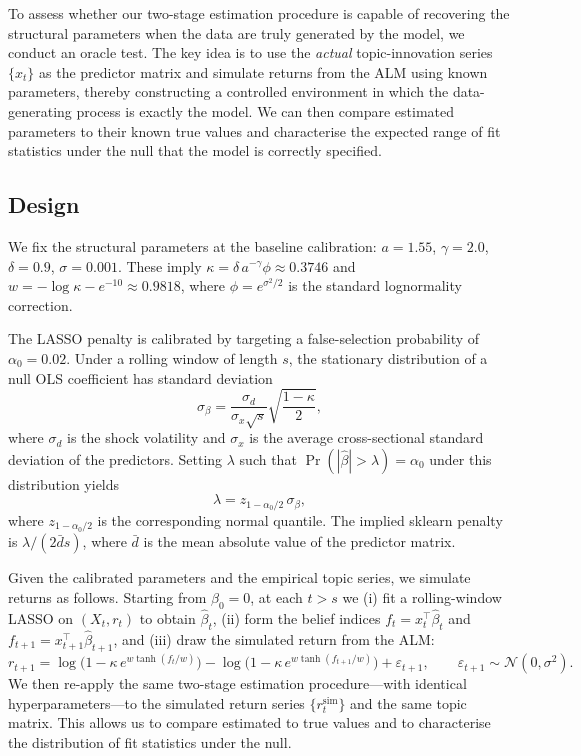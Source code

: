 \documentclass[11pt]{article}
\begin{document}
To assess whether our two-stage estimation procedure is capable of recovering the structural
parameters when the data are truly generated by the model, we conduct an oracle test.
The key idea is to use the \emph{actual} topic-innovation series $\{x_t\}$ as the predictor
matrix and simulate returns from the ALM using known parameters, thereby constructing a
controlled environment in which the data-generating process is exactly the model.
We can then compare estimated parameters to their known true values and characterise the
expected range of fit statistics under the null that the model is correctly specified.

\subsection*{Design}

We fix the structural parameters at the baseline calibration:
$a = 1.55$, $\gamma = 2.0$, $\delta = 0.9$, $\sigma = 0.001$.
These imply $\kappa = \delta \, a^{-\gamma} \phi \approx 0.3746$ and $w = -\log \kappa - e^{-10} \approx 0.9818$,
where $\phi = e^{\sigma^2/2}$ is the standard lognormality correction.

The LASSO penalty is calibrated by targeting a false-selection probability of $\alpha_0 = 0.02$.
Under a rolling window of length $s$, the stationary distribution of a null OLS coefficient has standard deviation
\[
  \sigma_{\beta} = \frac{\sigma_d}{\sigma_x \sqrt{s}} \sqrt{\frac{1-\kappa}{2}},
\]
where $\sigma_d$ is the shock volatility and $\sigma_x$ is the average cross-sectional
standard deviation of the predictors.
Setting $\lambda$ such that $\Pr(|\hat\beta| > \lambda) = \alpha_0$ under this distribution yields
\[
  \lambda = z_{1-\alpha_0/2} \,\sigma_{\beta},
\]
where $z_{1-\alpha_0/2}$ is the corresponding normal quantile.
The implied sklearn penalty is $\lambda / (2 \bar{d} s)$, where $\bar{d}$ is the mean absolute
value of the predictor matrix.

Given the calibrated parameters and the empirical topic series, we simulate returns as follows.
Starting from $\beta_0 = 0$, at each $t > s$ we (i) fit a rolling-window LASSO on
$(X_{t}, r_{t})$ to obtain $\hat\beta_t$, (ii) form the belief indices
$f_t = x_t^\top \hat\beta_t$ and $f_{t+1} = x_{t+1}^\top \hat\beta_{t+1}$, and (iii) draw the
simulated return from the ALM:
\[
r_{t+1}
= \log\!\bigl(1 - \kappa\,e^{w\tanh(f_t/w)}\bigr)
- \log\!\bigl(1 - \kappa\,e^{w\tanh(f_{t+1}/w)}\bigr)
+ \varepsilon_{t+1}, \qquad \varepsilon_{t+1} \sim \mathcal{N}(0, \sigma^2).
\]
We then re-apply the same two-stage estimation procedure---with identical hyperparameters---to
the simulated return series $\{r_t^{\text{sim}}\}$ and the same topic matrix.
This allows us to compare estimated to true values and to characterise the distribution of
fit statistics under the null.
\end{document}
